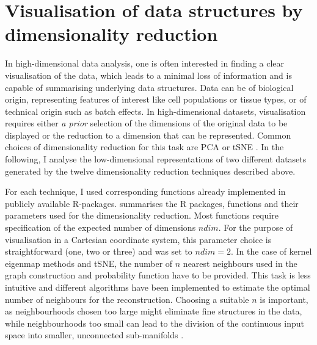 \section{Visualisation of data structures by dimensionality reduction}
\label{section:visualisation}
In high-dimensional data analysis, one is often interested in finding a clear visualisation of the data, which leads to a minimal loss of information and is capable of summarising underlying data structures. Data can be of biological origin, representing features of interest like cell populations or tissue types, or of technical origin such as batch effects. In high-dimensional datasets, visualisation requires either \textit{a prior} selection of the dimensions of the original data to be displayed or the reduction to a dimension that can be represented. Common choices of dimensionality reduction for this task are PCA or tSNE \citep{Deng2014,Crowley2015,Corces2016,Martinez-Jimenez2017,Huisman2017}. In the following, I analyse the low-dimensional representations of two different datasets generated by the twelve dimensionality reduction techniques described above.

For each technique, I used corresponding functions already implemented in publicly available R-packages.  summarises the R packages, functions and their parameters used for the dimensionality reduction. Most functions require specification of the expected number of dimensions \(ndim\). For the purpose of visualisation in a Cartesian coordinate system, this parameter choice is straightforward (one, two or three) and was set to  \(ndim=2\). In the case of kernel eigenmap methods and tSNE, the number of \(n\) nearest neighbours used in the graph construction and probability function have to be provided. This task is less intuitive and different algorithms have been implemented to estimate the optimal number of neighbours for the reconstruction. Choosing a suitable \(n\) is important, as neighbourhoods chosen too large might eliminate fine structures in the data, while neighbourhoods too small can lead to the division of the continuous input space into smaller, unconnected sub-manifolds \citep{Kayo2006}.

